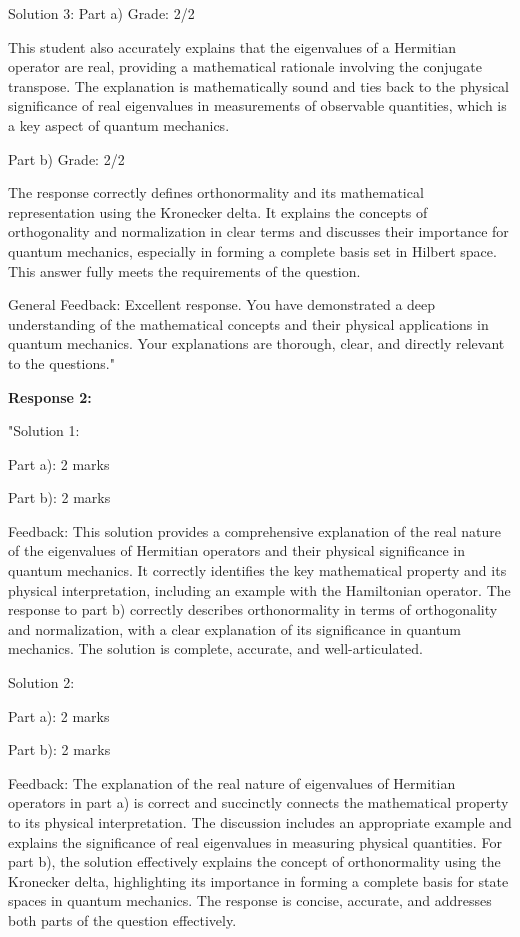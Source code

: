 \documentclass[a4paper,11pt]{article}
\begin{document}
Solution 3:
Part a)
Grade: 2/2

This student also accurately explains that the eigenvalues of a Hermitian operator are real, providing a mathematical rationale involving the conjugate transpose. The explanation is mathematically sound and ties back to the physical significance of real eigenvalues in measurements of observable quantities, which is a key aspect of quantum mechanics.

Part b)
Grade: 2/2

The response correctly defines orthonormality and its mathematical representation using the Kronecker delta. It explains the concepts of orthogonality and normalization in clear terms and discusses their importance for quantum mechanics, especially in forming a complete basis set in Hilbert space. This answer fully meets the requirements of the question.

General Feedback:
Excellent response. You have demonstrated a deep understanding of the mathematical concepts and their physical applications in quantum mechanics. Your explanations are thorough, clear, and directly relevant to the questions."

\textbf{Response 2:}

"Solution 1:

Part a): 2 marks

Part b): 2 marks

Feedback: This solution provides a comprehensive explanation of the real nature of the eigenvalues of Hermitian operators and their physical significance in quantum mechanics. It correctly identifies the key mathematical property and its physical interpretation, including an example with the Hamiltonian operator. The response to part b) correctly describes orthonormality in terms of orthogonality and normalization, with a clear explanation of its significance in quantum mechanics. The solution is complete, accurate, and well-articulated.

Solution 2:

Part a): 2 marks

Part b): 2 marks

Feedback: The explanation of the real nature of eigenvalues of Hermitian operators in part a) is correct and succinctly connects the mathematical property to its physical interpretation. The discussion includes an appropriate example and explains the significance of real eigenvalues in measuring physical quantities. For part b), the solution effectively explains the concept of orthonormality using the Kronecker delta, highlighting its importance in forming a complete basis for state spaces in quantum mechanics. The response is concise, accurate, and addresses both parts of the question effectively.
\end{document}
